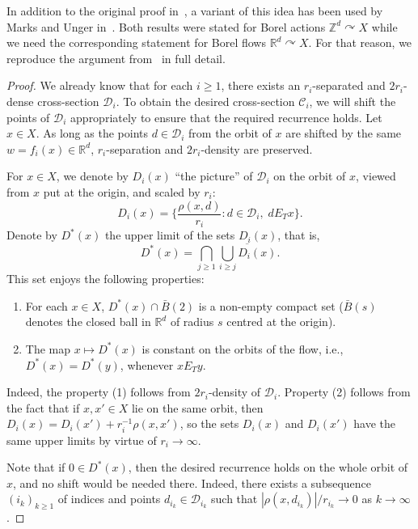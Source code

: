 \documentclass[11pt]{paper}
\newcommand{\bR}{\mathbb R}
\newcommand{\bZ}{\mathbb Z}
\newcommand{\cD}{\mathcal D}
\newcommand{\cC}{\mathcal C}
\begin{document}
In addition to the original proof in~\cite{BJ}, a variant of this idea has been used by Marks and
Unger in~\cite[Lemma~A.2]{Marks-Unger}.
Both results were stated  for Borel actions $\bZ^d\curvearrowright  X$ while we need the
corresponding statement for Borel flows $\bR^d\curvearrowright X$.
For that reason, we reproduce the argument from~\cite{Marks-Unger} in full detail.

\begin{proof}
We already know that for each $i\ge 1$, there exists an $r_i$-separated and
$2r_i$-dense cross-section $\cD_i$. To obtain the desired cross-section $\cC_i$, we will
shift the points of $\cD_i$ appropriately to ensure that the required recurrence holds.
Let $x\in X$. As long as the points $d\in \cD_i$ from the orbit of $x$
are  shifted by the same $w=f_{i}(x)\in\bR^d$, $r_i$-separation and $2r_i$-density are preserved.

\smallskip
For $x\in X$, we denote by $D_i(x)$ ``the picture'' of $\cD_i$ on the orbit of $x$,
viewed from $x$ put at the origin, and scaled by $r_i$:
\begin{equation}
\label{eq:def-Di}
D_i(x)=\Big\{\frac{\rho(x, d)}{r_i}\colon
d\in \cD_i,\; d E_T x\Big\}.
\end{equation}
Denote by $D^*(x)$ the upper limit of the sets $D_i(x)$, that is,
\[
D^*(x) = \bigcap_{j\ge 1} \overline{\bigcup_{i\ge j} D_i(x)}.
\]
This set enjoys the following properties:
\begin{enumerate}
\item[(1)] For each $x\in X$, $D^*(x)\cap \bar B(2)$  is a non-empty compact set
($\bar B(s)$ denotes the closed ball in $\bR^d$ of radius $s$
centred at the origin).
\item[(2)] The map $x \mapsto D^*(x)$ is constant on the orbits of the flow, i.e., $D^*(x)=D^*(y)$, whenever $x E_T y$.
\end{enumerate}
Indeed, the property (1) follows from $2r_i$-density of $\cD_i$. Property (2) follows from the fact that if
$x, x'\in X$ lie on the same orbit, then $D_i(x)=D_i(x') + r_i^{-1} \rho(x, x')$,
so the sets $D_i(x)$ and $D_i(x')$ have the
same upper limits by virtue of $r_i\to\infty$.

\smallskip
Note that if $0\in D^*(x)$, then the desired recurrence holds on the whole
orbit of $x$, and no shift would be needed there. Indeed, there exists a subsequence
$(i_k)_{k\ge 1}$ of indices and points $d_{i_k}\in \cD_{i_k}$ such that
$|\rho(x, d_{i_k})| /r_{i_k}\to 0$ as $k\to\infty$.


\end{proof}
\end{document}
